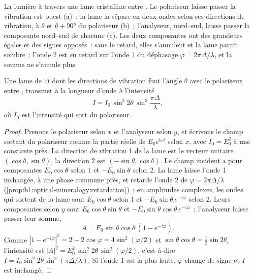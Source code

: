 \begin{omfigure}
{\small La lumière à travers une lame cristalline entre . Le
polariseur laisse passer la vibration est--ouest (a)~; la lame la sépare en deux
ondes selon ses directions de vibration, à $\theta$ et $\theta + \ang{90}$ du
polariseur (b)~; l'analyseur, nord--sud, laisse passer la composante nord--sud de
chacune (c). Les deux composantes ont des grandeurs égales et des signes
opposés~: sans le retard, elles s'annulent et la lame paraît sombre~; l'onde 2 est
en retard sur l'onde 1 du déphasage $\varphi = 2\pi\Delta/\lambda$, et la somme ne
s'annule plus.}
\end{omfigure}

\begin{theorem}\label{thm:b1:optical-mineralogy:intensity}
Une lame de  $\Delta$ dont les directions de vibration font
l'angle $\theta$ avec le polariseur, entre , transmet à la
longueur d'onde $\lambda$ l'intensité
\[
  I = I_0\,\sin^2 2\theta\,\sin^2\frac{\pi\Delta}{\lambda},
\]
où $I_0$ est l'intensité qui sort du polariseur.
\end{theorem}

\begin{proof}
Prenons le polariseur selon $x$ et l'analyseur selon $y$, et écrivons le champ
sortant du polariseur comme la partie réelle de $E_0 e^{i\omega t}$ selon $x$,
avec $I_0 = E_0^2$ à une constante près. La direction de vibration 1 de la lame
est le vecteur unitaire $(\cos\theta, \sin\theta)$, la direction 2 est
$(-\sin\theta, \cos\theta)$. Le champ incident a pour composantes
$E_0\cos\theta$ selon 1 et
$-E_0\sin\theta$ selon 2. La lame laisse l'onde 1 inchangée, à une phase commune
près, et retarde l'onde 2 de $\varphi = 2\pi\Delta/\lambda$
(\cref{prop:b1:optical-mineralogy:retardation})~; en amplitudes complexes, les
ondes qui sortent de la lame sont $E_0\cos\theta$ selon 1 et
$-E_0\sin\theta\,e^{-i\varphi}$ selon 2. Leurs composantes selon $y$ sont
$E_0\cos\theta\sin\theta$ et $-E_0\sin\theta\cos\theta\,e^{-i\varphi}$~;
l'analyseur laisse passer leur somme,
\[
  A = E_0\sin\theta\cos\theta\,(1 - e^{-i\varphi}) .
\]
Comme $|1 - e^{-i\varphi}|^2 = 2 - 2\cos\varphi = 4\sin^2(\varphi/2)$ et
$\sin\theta\cos\theta = \frac12\sin2\theta$, l'intensité est
$|A|^2 = E_0^2\,\sin^2 2\theta\,\sin^2(\varphi/2)$, c'est-à-dire
$I = I_0\sin^2 2\theta\sin^2(\pi\Delta/\lambda)$. Si l'onde 1 est la plus lente,
$\varphi$ change de signe et $I$ est inchangé.
\end{proof}

